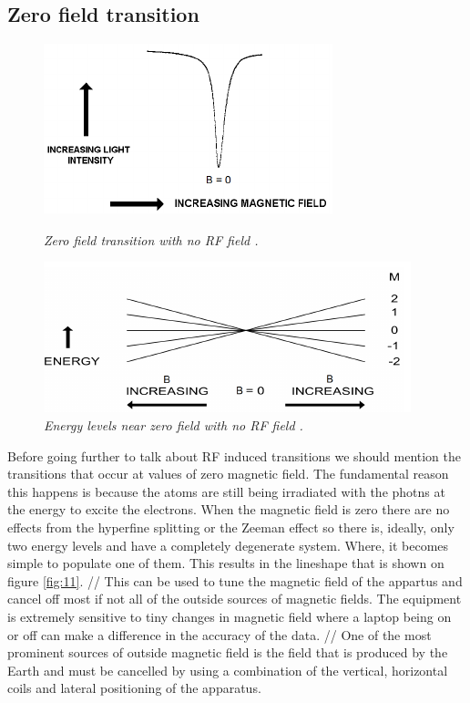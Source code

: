 \documentclass[twocolumn]{article}
\begin{document}
\subsection{Zero field transition}
\begin{figure}
\begin{minipage}[t]{0.44\textwidth}
\includegraphics[width=\linewidth]{pictures/zero-field-trans.png}
\caption{\textit{Zero field transition with no RF field \cite{ref:3}.}}
\label{fig:11}
\end{minipage}
\hfill
\begin{minipage}[t]{0.44\textwidth}
\includegraphics[width=\linewidth]{pictures/energy-zero.png}
\caption{\textit{Energy levels near zero field with no RF field \cite{ref:3}.}}
\label{fig:12}
\end{minipage}
\end{figure}
Before going further to talk about RF induced transitions we should mention the 
transitions that occur at values of zero magnetic field. The fundamental reason 
this happens is because the atoms are still being irradiated with the photns 
at the energy to excite the electrons. When the magnetic field is zero there 
are no effects from the hyperfine splitting or the Zeeman effect so there is, 
ideally, only two energy levels and have a completely degenerate system. Where, 
it becomes simple to populate one of them.
This results in the lineshape that is shown on figure \ref{fig:11}.
//
This can be used to tune the magnetic field of the appartus and cancel off most 
if not all of the outside sources of magnetic fields. The equipment is 
extremely sensitive to tiny changes in magnetic field where a laptop being on 
or off can make a difference in the accuracy of the data.
//
One of the most prominent sources of outside magnetic field is the field that 
is produced by the Earth and must be cancelled by using a combination of the 
vertical, horizontal coils and lateral positioning of the apparatus.
\end{document}
